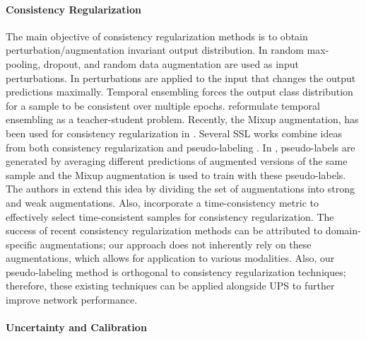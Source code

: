 \documentclass{article} \usepackage{iclr2021_conference,times}
\begin{document}
\paragraph{Consistency Regularization}
The main objective of consistency regularization methods is to obtain perturbation/augmentation invariant output distribution. In \citep{NIPS2016_6333} random max-pooling, dropout, and random data augmentation are used as input perturbations. In \citep{Miyato2018VirtualAT} perturbations are applied to the input that changes the output predictions maximally. Temporal ensembling \citep{LaineA17} forces the output class distribution for a sample to be consistent over multiple epochs. \cite{NIPS2017_6719_meanT} reformulate temporal ensembling as a teacher-student problem. Recently, the Mixup \citep{zhang2018mixup} augmentation, has been used for consistency regularization in \citep{Verma2019InterpolationCT}. Several SSL works combine ideas from both consistency regularization and pseudo-labeling \citep{NIPS2019_8749_MixMatch, Berthelot2020ReMixMatch:,zhoutime}. In \citep{NIPS2019_8749_MixMatch}, pseudo-labels are generated by averaging different predictions of augmented versions of the same sample and the Mixup augmentation is used to train with these pseudo-labels. The authors in \citep{Berthelot2020ReMixMatch:} extend this idea by dividing the set of augmentations into strong and weak augmentations. Also, \citep{zhoutime} incorporate a time-consistency metric to effectively select time-consistent samples for consistency regularization. The success of recent consistency regularization methods can be attributed to domain-specific augmentations; our approach does not inherently rely on these augmentations, which allows for application to various modalities. Also, our pseudo-labeling method is orthogonal to consistency regularization techniques; therefore, these existing techniques can be applied alongside UPS to further improve network performance.  

\paragraph{Uncertainty and Calibration}
\end{document}
